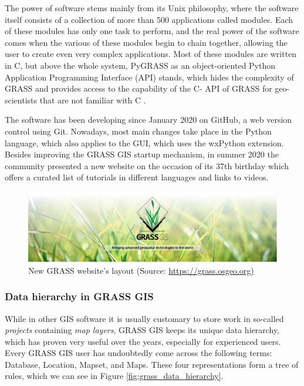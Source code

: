 \documentclass[a4paper,10pt,twoside]{article}
\begin{document}
The power of software stems mainly from its Unix philosophy, where the software itself consists of a collection of more than 500 applications called modules. Each of these modules has only one task to perform, and the real power of the software comes when the various of these modules begin to chain together, allowing the user to create even very complex applications. Most of these modules are written in C, but above the whole system, PyGRASS as an object-oriented Python Application Programming Interface (API) stands, which hides the complexity of GRASS and provides access to the capability of the C- API of GRASS for geo-scientists that are not familiar with C \cite{pygrass}.

The software has been developing since January 2020 on GitHub, a web version control using Git. Nowadays, most main changes take place in the Python language, which also applies to the GUI, which uses the wxPython extension. Besides improving the GRASS GIS startup mechanism, in summer 2020 the community presented a new website on the occasion of its 37th birthday which offers a curated list of tutorials in different languages and links to videos.


\vspace{0.3cm}
\begin{figure}[hbt!]
\begin{center}
\includegraphics[width=16cm]{../pictures/grass_gis.png} 
\caption[New GRASS website's layout]{New GRASS website's layout (Source: \url{https://grass.osgeo.org)}}
\label{fig:grass_gis}
\end{center}
\end{figure}

\newpage
\vspace*{-1cm}
\subsubsection{Data hierarchy in GRASS GIS}
\label{subsection:hierarchy}
\noindent
\large

\noindent While in other GIS software it is usually customary to store work in so-called \textit{projects} containing \textit{map layers}, GRASS GIS keeps its unique data hierarchy, which has proven very useful over the years, especially for experienced users. Every GRASS GIS user has undoubtedly come across the following terms: Database, Location, Mapset, and Maps. These four representations form a tree of rules, which we can see in Figure \ref{fig:grass_data_hierarchy}.
\end{document}
